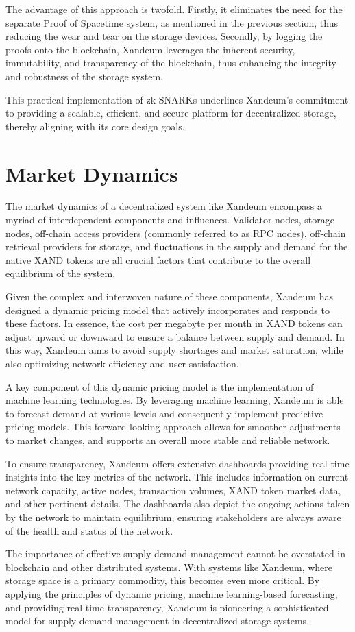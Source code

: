 \documentclass[11pt]{article}   	%
\begin{document}
The advantage of this approach is twofold. Firstly, it eliminates the need for the separate Proof of Spacetime system, as mentioned in the previous section, thus reducing the wear and tear on the storage devices. Secondly, by logging the proofs onto the blockchain, Xandeum leverages the inherent security, immutability, and transparency of the blockchain, thus enhancing the integrity and robustness of the storage system.

This practical implementation of zk-SNARKs underlines Xandeum's commitment to providing a scalable, efficient, and secure platform for decentralized storage, thereby aligning with its core design goals.

\section{Market Dynamics}
The market dynamics of a decentralized system like Xandeum encompass a myriad of interdependent components and influences. Validator nodes, storage nodes, off-chain access providers (commonly referred to as RPC nodes), off-chain retrieval providers for storage, and fluctuations in the supply and demand for the native XAND tokens are all crucial factors that contribute to the overall equilibrium of the system.

Given the complex and interwoven nature of these components, Xandeum has designed a dynamic pricing model that actively incorporates and responds to these factors. In essence, the cost per megabyte per month in XAND tokens can adjust upward or downward to ensure a balance between supply and demand. In this way, Xandeum aims to avoid supply shortages and market saturation, while also optimizing network efficiency and user satisfaction.

A key component of this dynamic pricing model is the implementation of machine learning technologies. By leveraging machine learning, Xandeum is able to forecast demand at various levels and consequently implement predictive pricing models. This forward-looking approach allows for smoother adjustments to market changes, and supports an overall more stable and reliable network.

To ensure transparency, Xandeum offers extensive dashboards providing real-time insights into the key metrics of the network. This includes information on current network capacity, active nodes, transaction volumes, XAND token market data, and other pertinent details. The dashboards also depict the ongoing actions taken by the network to maintain equilibrium, ensuring stakeholders are always aware of the health and status of the network.

The importance of effective supply-demand management cannot be overstated in blockchain and other distributed systems. With systems like Xandeum, where storage space is a primary commodity, this becomes even more critical. By applying the principles of dynamic pricing, machine learning-based forecasting, and providing real-time transparency, Xandeum is pioneering a sophisticated model for supply-demand management in decentralized storage systems.
\end{document}
